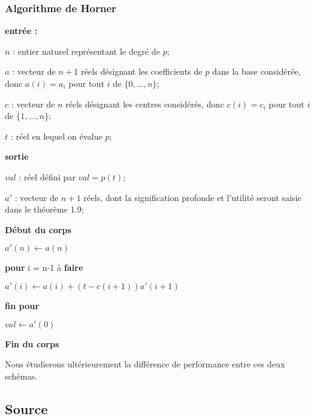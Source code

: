 \documentclass[a4paper,10pt]{report}
\begin{document}
\subsubsection*{Algorithme de Horner}

\textbf{entrée :}

\begin{list}{}{}
\item $n$ : entier naturel représentant le degré de $p$;
\item $a$ : vecteur de $n+1$ réels désignant les coefficients de $p$ dans la base considérée, donc $a(i) = a_{i}$ pour tout $i$ de $\lbrace 0, ..., n\rbrace$;
\item $c$ : vecteur de $n$ réels désignant les centres considérés, donc $c(i)=c_{i}$ pour tout $i$ de $\lbrace 1, ..., n\rbrace$;
\item $t$ : réel en lequel on évalue $p$;
\end{list}

\textbf{sortie}
\begin{list}{}{}
\item $val$ : réel défini par $val = p(t)$;
\item $a'$ : vecteur de $n+1$ réels, dont la signification profonde et l'utilité seront saisie dans le théorème 1.9;
\end{list}

\textbf{Début du corps}
\begin{list}{}{}
\item $a'(n) \longleftarrow a(n)$
\item \textbf{pour} i = n-1 à \textbf{faire}
\item \begin{list}{}{}
\item $a'(i) \longleftarrow a(i) + (t-c(i+1))a'(i+1)$
\end{list}
\item \textbf{fin pour}
\item $val \longleftarrow a'(0)$
\end{list}

\textbf{Fin du corps}

Nous étudierons ultérieurement la différence de performance entre ces deux schémas. 

\newpage
\subsection*{Source}


\end{document}
